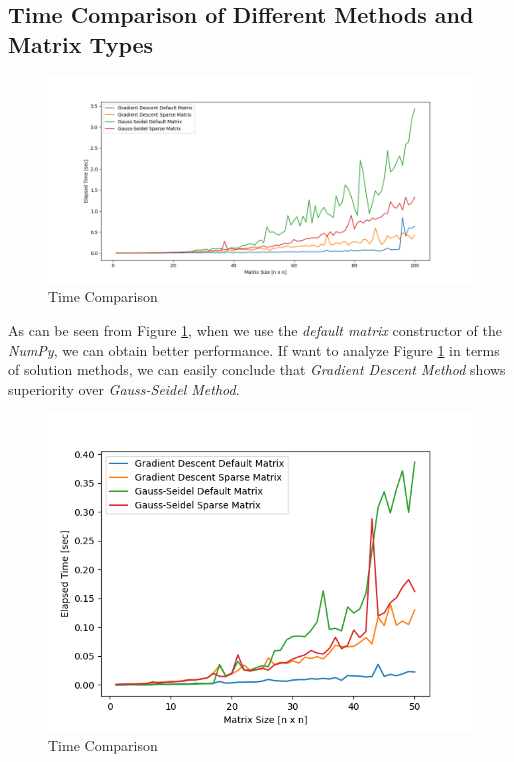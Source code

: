 \documentclass[letterpaper,12pt]{article}
\begin{document}
   \subsection{Time Comparison of Different Methods and Matrix Types}
   
\begin{figure}[H] 
   \centering \includegraphics[width=\columnwidth]{figures/linsystime.png}           
                \caption{Time Comparison}                
                   \label{fig:linsystime}
   \end{figure}
   As can be seen from Figure \ref{fig:linsystime}, when we use the \textit{default matrix} constructor of the \textit{NumPy}, we can obtain better performance. If want to analyze Figure \ref{fig:linsystime} in terms of solution methods, we can easily conclude that \textit{Gradient Descent Method} shows superiority over \textit{Gauss-Seidel Method}.
\begin{figure}[H] 
   \centering \includegraphics[width=\columnwidth]{figures/linsystime50.png}           
                  \caption{Time Comparison}                
                     \label{fig:linsystime50}
   \end{figure}
\end{document}
